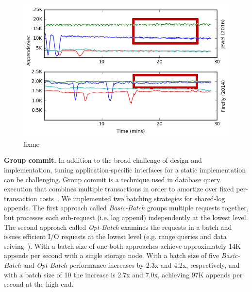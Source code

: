 \begin{figure}
    \centering
    \includegraphics[width=1.0\linewidth]{jewel_v_firefly_pd.png}
    \caption{fixme}
    \label{fig:phy-design}
\end{figure}

{\bf Group commit.} In addition to the broad challenge of design and
implementation, tuning application-specific interfaces for a static
implementation can be challenging.  Group commit is a technique used in
database query execution that combines multiple transactions in order to
amortize over fixed per-transaction costs~\cite{cite}. We implemented two
batching strategies for shared-log appends. The first approach called
\emph{Basic-Batch} groups multiple requests together, but processes each
sub-request (i.e. log append) independently at the lowest level.
The second approach called \emph{Opt-Batch} examines the requests in a batch
and issues efficient I/O requests at the lowest level (e.g. range queries and
data seiving~\cite{750599}). With a batch size of one both approaches achieve
approximately 14K appends per second with a single storage node. With a batch size of five
\emph{Basic-Batch} and \emph{Opt-Batch} performance increases by 2.3x and 4.2x,
respectively, and with a batch size of 10 the increase is 2.7x and 7.0x, achieving
97K appends per second at the high end.

